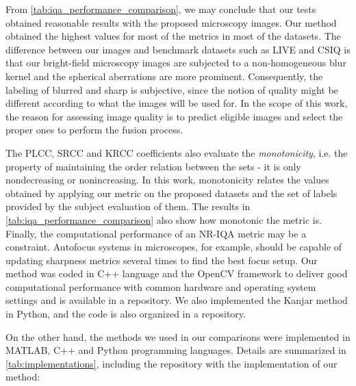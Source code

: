 From \autoref{tab:iqa_performance_comparison}, we may conclude that our tests obtained reasonable results with the proposed microscopy images. Our method obtained the highest values for most of the metrics in most of the datasets.  The difference between our images and benchmark datasets such as LIVE \cite{sheikh2006statistical} and CSIQ \cite{larson2010most} is that our bright-field microscopy images are subjected to a non-homogeneous blur kernel and the spherical aberrations are more prominent. Consequently, the labeling of blurred and sharp is subjective, since the notion of quality might be different according to what the images will be used for. In the scope of this work, the reason for assessing image quality is to predict eligible images and select the proper ones to perform the fusion process.

The PLCC, SRCC and KRCC coefficients also evaluate the \textit{monotonicity}, i.e. the property of maintaining the order relation between the sets - it is only nondecreasing or nonincreasing. In this work, monotonicity relates the values obtained by applying our metric on the proposed datasets and the set of labels provided by the subject evaluation of them. The results in \autoref{tab:iqa_performance_comparison} also show how monotonic the metric is. Finally, the computational performance of an NR-IQA metric may be a constraint. Autofocus systems in microscopes, for example, should be capable of updating sharpness metrics several times to find the best focus setup. Our method was coded in C++ language and the OpenCV framework to deliver good computational performance with common hardware and operating system settings and is available in a repository. We also implemented the Kanjar method in Python, and the code is also organized in a repository. 

On the other hand, the methods we used in our comparisons were implemented in MATLAB, C++ and Python programming languages. Details are summarized in \autoref{tab:implementations}, including the repository with the implementation of our method:

